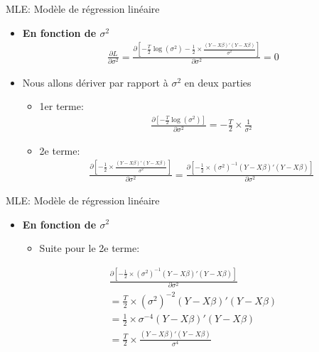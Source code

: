\documentclass{beamer}
\begin{document}
\begin{frame}{MLE: Modèle de régression linéaire}
\begin{itemize}
\item \textbf{En fonction de $\sigma^2$}
\begin{align*}
\frac{\partial L}{\partial \sigma^2}=\frac{\partial  \left[-\frac{T}{2} \log (\sigma^2)-\frac{1}{2} \times \frac{(Y-X \beta)'(Y-X \beta)}{\sigma^2} \right]}{\partial \sigma^2}=0
\end{align*}
\item Nous allons  dériver par rapport à $\sigma^2$ en deux parties
\begin{itemize}
\item 1er terme:
\begin{align*}
\frac{\partial \left[-\frac{T}{2} \log (\sigma^2) \right]}{\partial \sigma^2}=-\frac{T}{2} \times \frac{1}{\sigma^2}
\end{align*}
\end{itemize}
\begin{itemize}
\item 2e terme:
\begin{align*}
\frac{\partial \left[-\frac{1}{2} \times \frac{(Y-X \beta)'(Y-X \beta)}{\sigma^2} \right]}{\partial \sigma^2}=\frac{\partial \left[-\frac{1}{2} \times (\sigma^2)^{-1}(Y-X \beta)'(Y-X \beta) \right]}{\partial \sigma^2}
\end{align*}
\end{itemize}
\end{itemize}
\end{frame}

\begin{frame}{MLE: Modèle de régression linéaire}
\begin{itemize}
\item \textbf{En fonction de $\sigma^2$}
\begin{itemize}
\item Suite pour le 2e terme:
\end{itemize}
\begin{align*}
\frac{\partial \left[-\frac{1}{2} \times (\sigma^2)^{-1}(Y-X \beta)'(Y-X \beta) \right]}{\partial \sigma^2}\\ = \frac{T}{2} \times (\sigma^2)^{-2}(Y-X \beta)'(Y-X \beta) \\ =\frac{1}{2} \times \sigma^{-4}(Y-X\beta)'(Y-X \beta) \\ = \frac{T}{2} \times \frac{(Y-X\beta)'(Y-X \beta)}{\sigma^4}
\end{align*}
\end{itemize}
\end{frame}
\end{document}
